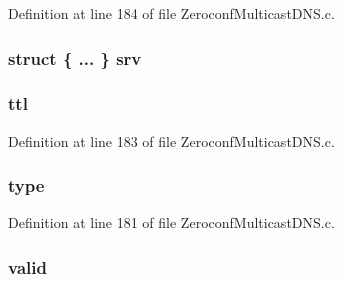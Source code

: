 Definition at line 184 of file Zeroconf\+Multicast\+D\+N\+S.\+c.

\hypertarget{struct__m_d_n_s_resource_record_ad81a3ff0d335297b2ed41298a66d2c9e}{}
\subsubsection[{srv}]{\setlength{\rightskip}{0pt plus 5cm}struct \{ ... \}   srv}\label{struct__m_d_n_s_resource_record_ad81a3ff0d335297b2ed41298a66d2c9e}
\hypertarget{struct__m_d_n_s_resource_record_aa870a15d42c33e1020feae042f862068}{}
\subsubsection[{ttl}]{ ttl}\label{struct__m_d_n_s_resource_record_aa870a15d42c33e1020feae042f862068}


Definition at line 183 of file Zeroconf\+Multicast\+D\+N\+S.\+c.

\hypertarget{struct__m_d_n_s_resource_record_a9ae55e4e4d9170990e695b3165dfaf75}{}
\subsubsection[{type}]{ type}\label{struct__m_d_n_s_resource_record_a9ae55e4e4d9170990e695b3165dfaf75}


Definition at line 181 of file Zeroconf\+Multicast\+D\+N\+S.\+c.

\hypertarget{struct__m_d_n_s_resource_record_a7c54cb0f9753b90be7ae144001428829}{}
\subsubsection[{valid}]{ valid}\label{struct__m_d_n_s_resource_record_a7c54cb0f9753b90be7ae144001428829}



